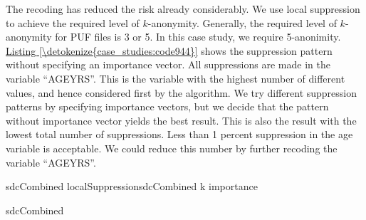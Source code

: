 \documentclass[letterpaper,10pt,english]{sphinxmanual}
\begin{document}

The recoding has reduced the risk already considerably. We use local
suppression to achieve the required level of \(k\)-anonymity.
Generally, the required level of \(k\)-anonymity for PUF files is 3
or 5. In this case study, we require 5-anonimity. \hyperref[\detokenize{case_studies:code944}]{Listing \ref{\detokenize{case_studies:code944}}} shows the
suppression pattern without specifying an importance vector. All
suppressions are made in the variable “AGEYRS”. This is the variable
with the highest number of different values, and hence considered first
by the algorithm. We try different suppression patterns by specifying
importance vectors, but we decide that the pattern without importance
vector yields the best result. This is also the result with the lowest
total number of suppressions. Less than 1 percent suppression in the age
variable is acceptable. We could reduce this number by further recoding
the variable “AGEYRS”.

\def\sphinxLiteralBlockLabel{\label{\detokenize{case_studies:code944}}}
%
\begin{sphinxVerbatim}[commandchars=\\\{\},numbers=left,firstnumber=1,stepnumber=1]
sdcCombined  localSuppressionsdcCombined k   importance  

sdcCombined 
\end{sphinxVerbatim}
\end{document}
